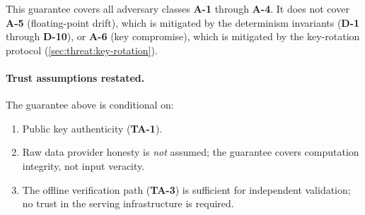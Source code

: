 This guarantee covers all adversary classes \textbf{A-1} through
\textbf{A-4}.  It does not cover \textbf{A-5} (floating-point drift),
which is mitigated by the determinism invariants (\textbf{D-1} through
\textbf{D-10}), or \textbf{A-6} (key compromise), which is mitigated by
the key-rotation protocol (\cref{sec:threat:key-rotation}).

\paragraph{Trust assumptions restated.}
The guarantee above is conditional on:
\begin{enumerate}
  \item Public key authenticity (\textbf{TA-1}).
  \item Raw data provider honesty is \emph{not} assumed; the guarantee
    covers computation integrity, not input veracity.
  \item The offline verification path (\textbf{TA-3}) is sufficient for
    independent validation; no trust in the serving infrastructure is
    required.
\end{enumerate}
